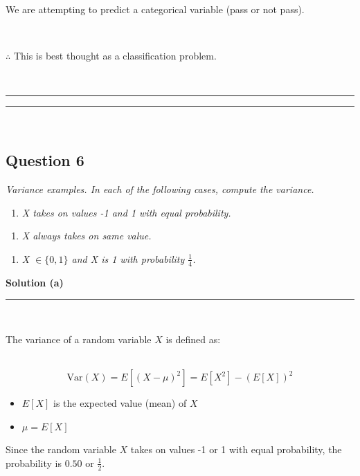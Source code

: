 \documentclass{article}
\begin{document}
\parbox{\textwidth}{We are attempting to predict a categorical variable (pass or not pass).}\\

\parbox{\textwidth}{$\therefore$ This is best thought as a classification problem.}\\

\noindent\rule{\textwidth}{0.4pt}

\noindent\rule{\textwidth}{0.4pt}\\

\newpage

\subsection*{Question 6}
\textit{Variance examples. In each of the following cases, compute the variance.}

\begin{enumerate}[label=(a)]
  \item \textit{X takes on values -1 and 1 with equal probability.}
\end{enumerate}

\begin{enumerate}[label=(b)]
  \item \textit{X always takes on same value.}
\end{enumerate}

\begin{enumerate}[label=(c)]
  \item \textit{X $\in \{0,1\}$ and X is 1 with probability $\frac{1}{4}$.}
\end{enumerate}

\textbf{Solution (a)}

\noindent\rule{\textwidth}{0.4pt}\\

\parbox{\textwidth}{The variance of a random variable $X$ is defined as:}\\

$$\text{Var}(X) = E[(X - \mu)^2] = E[X^2] - (E[X])^2$$

\begin{itemize}
    \item $E[X]$ is the expected value (mean) of $X$
    \item $\mu = E[X]$
\end{itemize}

\parbox{\textwidth}{Since the random variable $X$ takes on values -1 or 1 with equal probability, the probability is $0.50$ or $\frac{1}{2}$.}\\
\end{document}
